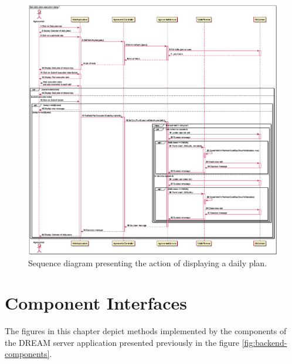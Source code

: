 \begin{figure}[H]
    \centering
    \includegraphics[height=\textheight, width=\textwidth, keepaspectratio, origin=c]{diagrams/sequence/set_daily_plan_execution_state}
    \caption{Sequence diagram presenting the action of displaying a daily plan.}
    \label{fig:sd_set_daily_plan_execution_state}
\end{figure}

\section{Component Interfaces}
The figures in this chapter depict methods implemented by the components of the DREAM server application presented previously in the figure \ref{fig:backend-components}.

